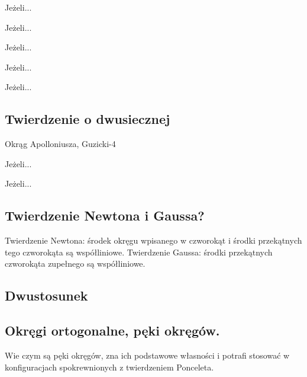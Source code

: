 \begin{definition}
	Jeżeli...
\end{definition}
\begin{proposition}
	Jeżeli...
\end{proposition}
\begin{definition}[oś potęgowa]
	Jeżeli...
\end{definition}
\begin{theorem}[Monge'a]
	Jeżeli...
\end{theorem}
\begin{theorem}[Auberta]
	Jeżeli...
\end{theorem}


\subsection{Twierdzenie o dwusiecznej}
Okrąg Apolloniusza, Guzicki-4

\begin{proposition}
	Jeżeli...
\end{proposition}



\begin{definition}
	Jeżeli...
\end{definition}


\subsection{Twierdzenie Newtona i Gaussa?}
Twierdzenie Newtona: środek okręgu wpisanego w czworokąt i środki przekątnych tego czworokąta są współliniowe.
Twierdzenie Gaussa: środki przekątnych czworokąta zupełnego są współliniowe.

\subsection{Dwustosunek}

\subsection{Okręgi ortogonalne, pęki okręgów.}
Wie czym są pęki okręgów, zna ich podstawowe własności i potrafi stosować w konfiguracjach spokrewnionych z twierdzeniem Ponceleta.   

